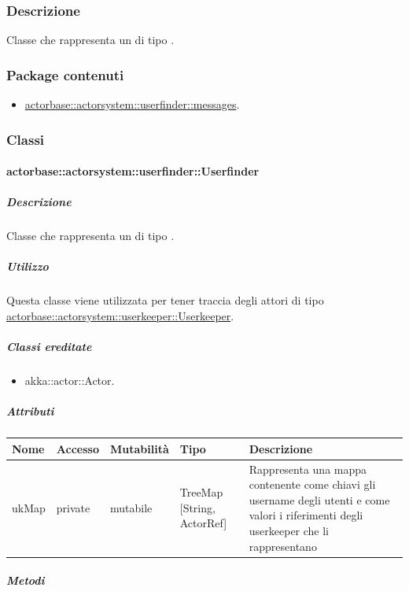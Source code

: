 \documentclass{scalatekids-article}
\begin{document}
\subsubsection{Descrizione}
Classe che rappresenta un  di tipo .

\subsubsection{Package contenuti}
\begin{itemize}
  \item \hyperref[sec:actorbase::actorsystem::userfinder::messages]{actorbase::actorsystem::userfinder::messages}.
\end{itemize}

\subsubsection{Classi}

\paragraph{actorbase::actorsystem::userfinder::Userfinder}
\label{sec:actorbase::actorsystem::userfinder::Userfinder}

\subparagraph{Descrizione}
Classe che rappresenta un  di tipo .

\subparagraph{Utilizzo}
Questa classe viene utilizzata per tener traccia degli attori di tipo
\hyperref[sec:actorbase::actorsystem::userkeeper::Userkeeper]{actorbase::actorsystem::userkeeper::Userkeeper}.

\subparagraph{Classi ereditate}
\begin{itemize}
  \item akka::actor::Actor.
\end{itemize}

\subparagraph{Attributi}
\begin{tabular}{| p{3cm} | p{1.5cm} | p{2cm} | p{2cm} | p{8.5cm} |}
  \hline
  Nome & Accesso & Mutabilità & Tipo & Descrizione\\
  \hline
  ukMap & private & mutabile & TreeMap [String, ActorRef] & Rappresenta una mappa contenente come chiavi gli username degli utenti e come valori i riferimenti degli userkeeper che li rappresentano \\
  \hline
\end{tabular}

\subparagraph{Metodi}
\end{document}
